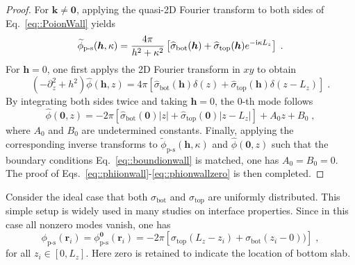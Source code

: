 \begin{proof}
	For $\bm{k}\neq\bm{0}$, applying the quasi-2D Fourier transform to both sides of Eq.~\eqref{eq::PoionWall} yields
	\begin{equation}
		\widetilde{\phi}_{\text{p-s}}(\bm{h},\kappa)=\frac{4\pi}{h^2+\kappa^2}\left[\widehat{\sigma}_{\mathrm{bot}}(\bm{h})+\widehat{\sigma}_{\mathrm{top}}(\bm{h})e^{-\mathrm{i} \kappa L_z}\right]\;.
	\end{equation}
	For $\bm{h}=0$, one first applys the 2D Fourier transform in $xy$ to obtain
	\begin{equation}
		\left(-\partial_z^2+h^2\right)\widehat{\phi}(\bm{h},z)=4\pi\left[\widehat{\sigma}_{\mathrm{bot}}(\bm{h})\delta(z)+\widehat{\sigma}_{\mathrm{top}}(\bm{h})\delta(z-L_z)\right]\;.
	\end{equation}
	By integrating both sides twice and taking $\bm{h}=0$, the $0$-th mode follows 
	\begin{equation}
		\widehat{\phi}(\bm{0},z)=-2\pi\left[\widehat{\sigma}_{\mathrm{bot}}(\bm{0})|z|+\widehat{\sigma}_{\mathrm{top}}(\bm{0})|z-L_z|\right]+A_0z+B_0\;,
	\end{equation}
	where $A_0$ and $B_0$ are undetermined constants. 
	Finally, applying the corresponding inverse transforms to $\widetilde{\phi}_{\text{p-s}}(\bm{h},\kappa)$ and $\widehat{\phi}(\bm{0},z)$ such that the boundary conditions Eq.~\eqref{eq::boundionwall} is matched, one has $A_0=B_0=0$. The proof of Eqs.~\eqref{eq::phiionwall}-\eqref{eq::phionwallzero} is then completed. 
\end{proof}


Consider the ideal case that both $\sigma_{\mathrm{bot}}$ and $\sigma_{\mathrm{top}}$ are uniformly distributed. This simple setup is widely used in many studies on interface properties. Since in this case all nonzero modes vanish, one has
\begin{equation}\label{eq:spectial}
	\phi_{\text{p-s}}(\bm{r}_{i})=\phi_{\text{p-s}}^{\bm{0}}(\bm{r}_{i})=-2\pi\left[\sigma_{\mathrm{top}}(L_z - z_{i})+\sigma_{\mathrm{bot}}(z_{i} - 0))\right]\;,
\end{equation}
for all $z_{i}\in [0, L_z]$. 
Here zero is retained to indicate the location of bottom slab. 

